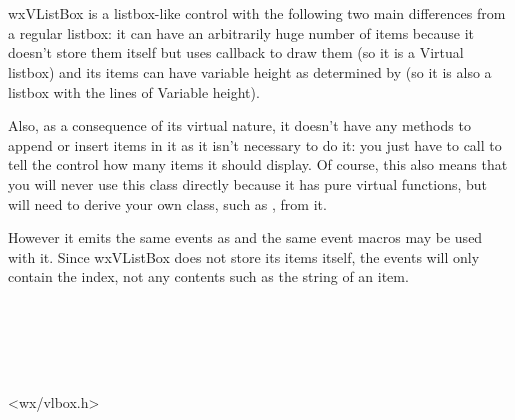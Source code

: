 
\section{}\label{wxvlistbox}

wxVListBox is a listbox-like control with the following two main differences
from a regular listbox: it can have an arbitrarily huge number of items because
it doesn't store them itself but uses 
callback to draw them (so it is a {\Large V}irtual listbox) and its items can
have variable height as determined by
 (so it is also a listbox
with the lines of {\Large V}ariable height).

Also, as a consequence of its virtual nature, it doesn't have any methods to
append or insert items in it as it isn't necessary to do it: you just have to
call  to tell the control how
many items it should display. Of course, this also means that you will never
use this class directly because it has pure virtual functions, but will need to
derive your own class, such as , from it.

However it emits the same events as  and the same
event macros may be used with it. Since wxVListBox does not store its items
itself, the events will only contain the index, not any contents such as the
string of an item.


\\
\\
\\
\\


<wx/vlbox.h>


